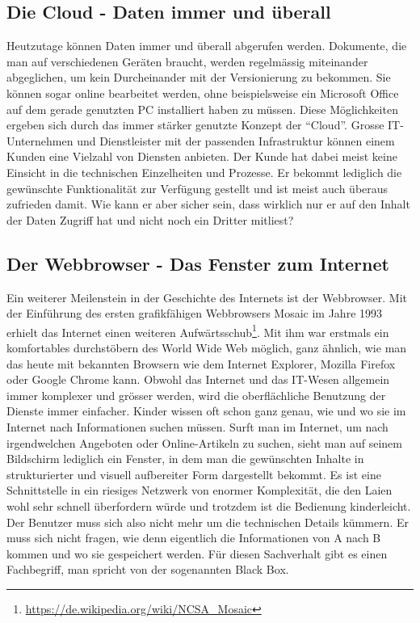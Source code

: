 \subsection{Die Cloud - Daten immer und überall}
Heutzutage können Daten immer und überall abgerufen werden. Dokumente, die man auf verschiedenen Geräten braucht, werden regelmässig miteinander abgeglichen, um kein Durcheinander mit der Versionierung zu bekommen. Sie können sogar online bearbeitet werden, ohne beispielsweise ein Microsoft Office auf dem gerade genutzten PC installiert haben zu müssen. Diese Möglichkeiten ergeben sich durch das immer stärker genutzte Konzept der ``Cloud''. Grosse IT-Unternehmen und Dienstleister mit der passenden Infrastruktur können einem Kunden eine Vielzahl von Diensten anbieten. Der Kunde hat dabei meist keine Einsicht in die technischen Einzelheiten und Prozesse. Er bekommt lediglich die gewünschte Funktionalität zur Verfügung gestellt und ist meist auch überaus zufrieden damit. Wie kann er aber sicher sein, dass wirklich nur er auf den Inhalt der Daten Zugriff hat und nicht noch ein Dritter mitliest?

\subsection{Der Webbrowser - Das Fenster zum Internet}
Ein weiterer Meilenstein in der Geschichte des Internets ist der Webbrowser. Mit der Einführung des ersten grafikfähigen Webbrowsers Mosaic im Jahre 1993 erhielt das Internet einen weiteren Aufwärtsschub\footnote{\url{https://de.wikipedia.org/wiki/NCSA_Mosaic}}.
Mit ihm war erstmals ein komfortables durchstöbern des World Wide Web möglich, ganz ähnlich, wie man das heute mit bekannten Browsern wie dem Internet Explorer, Mozilla Firefox oder Google Chrome kann. Obwohl das Internet und das IT-Wesen allgemein immer komplexer und grösser werden, wird die oberflächliche Benutzung der Dienste immer einfacher. Kinder wissen oft schon ganz genau, wie und wo sie im Internet nach Informationen suchen müssen. Surft man im Internet, um nach irgendwelchen Angeboten oder Online-Artikeln zu suchen, sieht man auf seinem Bildschirm lediglich ein Fenster, in dem man die gewünschten Inhalte in strukturierter und visuell aufbereiter Form dargestellt bekommt. Es ist eine Schnittstelle in ein riesiges Netzwerk von enormer Komplexität, die den Laien wohl sehr schnell überfordern würde und trotzdem ist die Bedienung kinderleicht. Der Benutzer muss sich also nicht mehr um die technischen Details kümmern. Er muss sich nicht fragen, wie denn eigentlich die Informationen von A nach B kommen und wo sie gespeichert werden. Für diesen Sachverhalt gibt es einen Fachbegriff, man spricht von der sogenannten Black Box.


